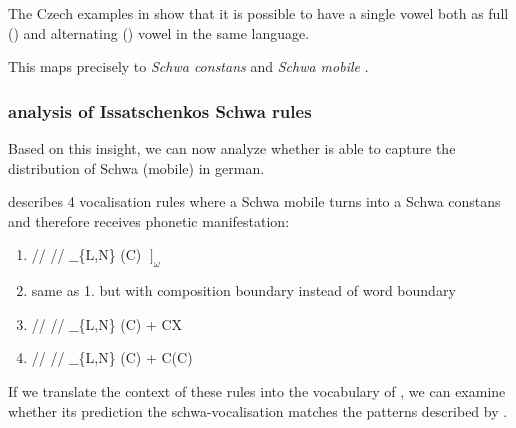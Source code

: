 The Czech examples in  show that it is possible
to have a single vowel both as full () and alternating ()
vowel in the same language.

This maps precisely to \emph{Schwa constans} and \emph{Schwa mobile}
\cite{issatschenko1974}.

\subsubsection{\CVCV analysis of Issatschenkos Schwa rules}
Based on this insight, we can now analyze whether \CVCV is able to capture
the distribution of Schwa (mobile) in german.



\citeauthor{issatschenko1974} describes 4 vocalisation rules where
a Schwa mobile turns into a Schwa constans and therefore receives
phonetic manifestation:

\begin{enumerate}
  \item \deriv
    {/\schwaMobi/}    %
    {/\schwaCons/}    %
    {$\_\_$\{L,N\} (C) $\;\big]_\omega$}
  \item same as 1. but with composition boundary instead of word boundary
  \item \deriv
    {/\schwaMobi/}    %
    {/\schwaCons/}    %
    {$\_\_$\{L,N\} (C) + CX}
  \item \deriv
    {/\schwaMobi/}    %
    {/\schwaCons/}    %
    {$\_\_$\{L,N\} (C) + \schwaMobi C(C)}
\end{enumerate}

If we translate the context of these rules into the
vocabulary of \CVCV, we can examine whether its prediction
 the schwa-vocalisation matches the patterns
described by \citeauthor{issatschenko1974}.

